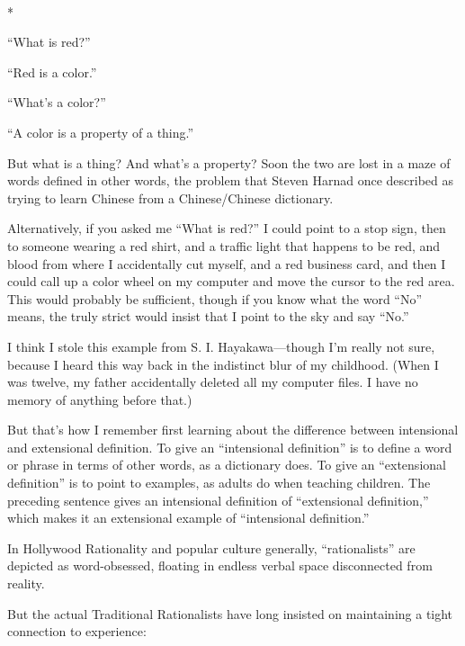 {\centering
 \ ~
\par}

{\centering
 *
\par}


{
 ``What is red?''}

{
 ``Red is a color.''}

{
 ``What's a
color?''}

{
 ``A color is a property of a
thing.''}

{
 But what is a thing? And what's a property? Soon
the two are lost in a maze of words defined in other words, the problem
that Steven Harnad once described as trying to learn Chinese from a
Chinese/Chinese dictionary.}

{
 Alternatively, if you asked me ``What is
red?'' I could point to a stop sign, then to someone
wearing a red shirt, and a traffic light that happens to be red, and
blood from where I accidentally cut myself, and a red business card,
and then I could call up a color wheel on my computer and move the
cursor to the red area. This would probably be sufficient, though if
you know what the word ``No'' means,
the truly strict would insist that I point to the sky and say
``No.''}

{
 I think I stole this example from S. I. Hayakawa---though
I'm really not sure, because I heard this way back in
the indistinct blur of my childhood. (When I was twelve, my father
accidentally deleted all my computer files. I have no memory of
anything before that.)}

{
 But that's how I remember first learning about the
difference between intensional and extensional definition. To give an
``intensional definition'' is to
define a word or phrase in terms of other words, as a dictionary does.
To give an ``extensional
definition'' is to point to examples, as adults do
when teaching children. The preceding sentence gives an intensional
definition of ``extensional
definition,'' which makes it an extensional example
of ``intensional definition.''}

{
 In Hollywood Rationality and popular culture generally,
``rationalists'' are depicted as
word-obsessed, floating in endless verbal space disconnected from
reality.}

{
 But the actual Traditional Rationalists have long insisted on
maintaining a tight connection to experience:}

